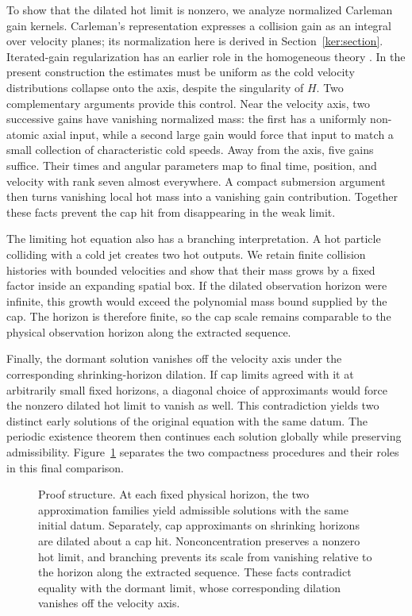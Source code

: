To show that the dilated hot limit is nonzero, we analyze normalized
Carleman gain kernels. Carleman's representation expresses a collision
gain as an integral over velocity planes; its normalization here is
derived in Section~\ref{ker:section}. Iterated-gain regularization has
an earlier role in the homogeneous theory
\cite[Lemma~2.1]{MischlerWennberg1999}. In the present construction the
estimates must be uniform as the cold velocity distributions collapse
onto the axis, despite the singularity of \(H\).
Two complementary arguments provide this control. Near the velocity
axis, two successive gains have vanishing normalized mass: the first
has a uniformly non-atomic axial input, while a second large gain would
force that input to match a small collection of characteristic cold
speeds. Away from the axis, five gains suffice. Their times and angular
parameters map to final time, position, and velocity with rank seven
almost everywhere. A compact submersion argument then turns vanishing
local hot mass into a vanishing gain contribution. Together these facts
prevent the cap hit from disappearing in the weak limit.

The limiting hot equation also has a branching interpretation. A hot
particle colliding with a cold jet creates two hot outputs. We retain
finite collision histories with bounded velocities and show that their
mass grows by a fixed factor inside an expanding spatial box. If the
dilated observation horizon were infinite, this growth would exceed
the polynomial mass bound supplied by the cap. The horizon is therefore
finite, so the cap scale remains comparable to the physical observation
horizon along the extracted sequence.

Finally, the dormant solution vanishes off the velocity axis under the
corresponding shrinking-horizon dilation. If cap limits agreed with it
at arbitrarily small fixed horizons, a diagonal choice of approximants
would force the nonzero dilated hot limit to vanish as well. This
contradiction yields two distinct early solutions of the original
equation with the same datum. The periodic existence theorem then
continues each solution globally while preserving admissibility.
Figure~\ref{fig:proof-route} separates the two compactness procedures
and their roles in this final comparison.

\begin{figure}[p]
\centering

\caption{Proof structure. At each fixed physical horizon, the two
approximation families yield admissible solutions with the same initial
datum. Separately, cap approximants on shrinking horizons are dilated
about a cap hit. Nonconcentration preserves a nonzero hot limit, and
branching prevents its scale from vanishing relative to the horizon along
the extracted sequence. These facts contradict equality with the dormant
limit, whose corresponding dilation vanishes off the velocity axis.}
\label{fig:proof-route}
\end{figure}

